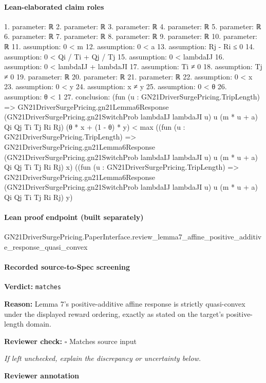 \documentclass[10pt]{article}
\newcommand{\reviewerbox}{%
  \par\noindent\fbox{\parbox{0.96\linewidth}{\rule{0pt}{0.38in}}}\par
}
\newcommand{\reviewmatch}[1]{%
  \par\noindent\textbf{Reviewer check:} $\square$\; #1\par
  \noindent\emph{If left unchecked, explain the discrepancy or uncertainty below.}\par
}
\begin{document}
\paragraph{Lean-elaborated claim roles}\begin{ReviewVerbatim}
1. parameter: ℝ
2. parameter: ℝ
3. parameter: ℝ
4. parameter: ℝ
5. parameter: ℝ
6. parameter: ℝ
7. parameter: ℝ
8. parameter: ℝ
9. parameter: ℝ
10. parameter: ℝ
11. assumption: 0 < m
12. assumption: 0 < a
13. assumption: Rj - Ri ≤ 0
14. assumption: 0 < Qi / Ti + Qj / Tj
15. assumption: 0 < lambdaIJ
16. assumption: 0 < lambdaIJ + lambdaJI
17. assumption: Ti ≠ 0
18. assumption: Tj ≠ 0
19. parameter: ℝ
20. parameter: ℝ
21. parameter: ℝ
22. assumption: 0 < x
23. assumption: 0 < y
24. assumption: x ≠ y
25. assumption: 0 < θ
26. assumption: θ < 1
27. conclusion: (fun (u : GN21DriverSurgePricing.TripLength) =>
      GN21DriverSurgePricing.gn21Lemma6Response (GN21DriverSurgePricing.gn21SwitchProb lambdaIJ lambdaJI u) u
        (m * u + a) Qi Qj Ti Tj Ri Rj)
    (θ * x + (1 - θ) * y) <
  max
    ((fun (u : GN21DriverSurgePricing.TripLength) =>
        GN21DriverSurgePricing.gn21Lemma6Response (GN21DriverSurgePricing.gn21SwitchProb lambdaIJ lambdaJI u) u
          (m * u + a) Qi Qj Ti Tj Ri Rj)
      x)
    ((fun (u : GN21DriverSurgePricing.TripLength) =>
        GN21DriverSurgePricing.gn21Lemma6Response (GN21DriverSurgePricing.gn21SwitchProb lambdaIJ lambdaJI u) u
          (m * u + a) Qi Qj Ti Tj Ri Rj)
      y)
\end{ReviewVerbatim}

\paragraph{Lean proof endpoint (built separately)}\begin{ReviewVerbatim}
GN21DriverSurgePricing.PaperInterface.review_lemma7_affine_positive_additive_response_quasi_convex
\end{ReviewVerbatim}

\paragraph{Recorded source-to-Spec screening}
\textbf{Verdict:} \texttt{matches}
\\
{\raggedright
\textbf{Reason:} Lemma 7's positive-\allowbreak{}additive affine response is strictly quasi-\allowbreak{}convex under the displayed reward ordering, exactly as stated on the target's positive-\allowbreak{}length domain.\allowbreak{}
\par}
\reviewmatch{Matches source input}
\noindent\textbf{Reviewer annotation}\par
\reviewerbox
\clearpage
\hypertarget{source-claim-72681991e4ec9e7d}{}
\end{document}
